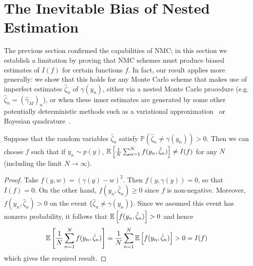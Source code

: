 
\section{The Inevitable Bias of Nested Estimation} 
\label{sec:bias}

The previous section confirmed the capabilities of NMC; in this section we establish a
limitation by proving that NMC schemes must produce biased estimates of $I(f)$ for certain
functions $f$. In fact, our result applies more generally: we show that this holds for any
Monte Carlo scheme that makes use of imperfect estimates $\hat{\zeta}_n$ of $\gamma(y_n)$,
either via a nested Monte Carlo procedure (e.g. $\hat{\zeta}_n = (\hat{\gamma}_M)_n$), or
when these inner estimates are generated by some other potentially deterministic methods
such as a variational approximation~\citep{blei2016variational} or Bayesian
quadrature~\citep{o1991bayes}.
\begin{theorem}
  Suppose that the random variables $\hat{\zeta}_n$ satisfy
    $\mathbb{P}(\hat{\zeta}_n \neq \gamma(y_n)) > 0$.
  Then we can choose $f$ such that if $y_n \sim p(y)$,
    $\mathbb{E}\left[\frac{1}{N} \sum_{n=1}^N f(y_n, \hat{\zeta}_n)\right] \neq I(f)$ for any
    $N$ (including the limit $N\rightarrow\infty$).
\end{theorem}
\begin{proof}
	Take $f(y, w) = (\gamma(y) - w)^2$. Then $f(y, \gamma(y)) = 0$, so that $I(f) = 0$.  On
	the other hand, $f(y_n, \hat{\zeta}_n) \geq 0$ since $f$ is non-negative.
	Moreover, $f(y_n, \hat{\zeta}_n) > 0$ on the event $\{\hat{\zeta}_n \neq \gamma(y_n)\}$.
	Since we assumed this event has nonzero probability, it follows that $\mathbb{E} \left[f(y_n, \hat{\zeta}_n)\right] > 0$ and hence
	\[
	\mathbb{E}\left[\frac{1}{N} \sum_{n=1}^N f(y_n, \hat{\zeta}_n)\right]
	= \frac{1}{N} \sum_{n=1}^N \mathbb{E}\left[f(y_n, \hat{\zeta}_n)\right]
	> 0 = I(f)
	\]
	which gives the required result.
\end{proof}
